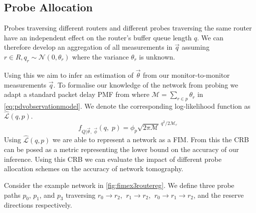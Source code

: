 \subsection{Probe Allocation}
\label{ssec:Mprobeallocation}
Probes traversing different routers and different probes traversing the same router have an independent effect on the router's buffer queue length $q$. We can therefore develop an aggregation of all measurements in $\vec{q}$ assuming $r\in R, q_r \sim \mathcal{N}(0, \theta_r)$ where the variance $\theta_r$ is unknown.\par
Using this we aim to infer an estimation of $\vec{\theta}$ from our monitor-to-monitor measurements $\vec{q}$. To formalise our knowledge of the network from probing we adapt a standard packet delay PMF from \cite{he_network_2021} where $\mathcal{M} = \sum_{r\in p}\theta_r$ in \cref{eq:pdvobservationmodel}. We denote the corresponding log-likelihood function as $\widehat{\mathcal{L}}(q, p)$.
\begin{equation}
\label{eq:pdvobservationmodel}
    f_{Q|\vec{\theta},\; \vec{\phi}}(q,\;p) = \phi_p \sqrt{2\pi\mathcal{M}}^{\ q^2/{2\mathcal{M}_r}}
\end{equation}
Using $\widehat{\mathcal{L}}(q, p)$ we are able to represent a network as a FIM. From this the CRB can be posed as a metric representing the lower bound on the accuracy of our inference. Using this CRB we can evaluate the impact of different probe allocation schemes on the accuracy of network tomography.\par
Consider the example network in \cref{fig:fimex3routereg}. We define three probe paths $p_0$, $p_1$, and $p_3$ traversing $r_0\rightarrow r_2$, $\ r_1\rightarrow r_2$, $\ r_0\rightarrow r_1\rightarrow r_2$, and the reserve directions respectively.
